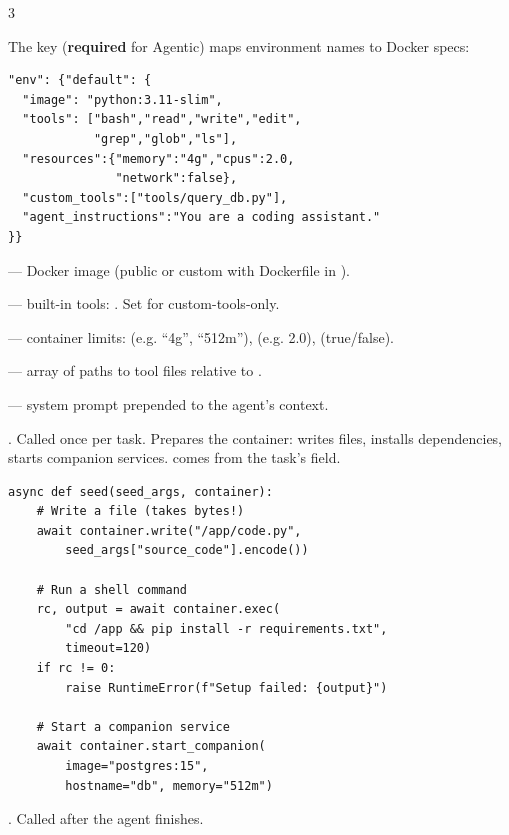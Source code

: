\documentclass[10pt,landscape]{article}
\begin{document}
\begin{multicols}{3}

The  key (\textbf{required} for Agentic) maps environment names to Docker specs:

\begin{lstlisting}
"env": {"default": {
  "image": "python:3.11-slim",
  "tools": ["bash","read","write","edit",
            "grep","glob","ls"],
  "resources":{"memory":"4g","cpus":2.0,
               "network":false},
  "custom_tools":["tools/query_db.py"],
  "agent_instructions":"You are a coding assistant."
}}
\end{lstlisting}

 --- Docker image (public or custom with Dockerfile in ).

 --- built-in tools: . Set \mono{[]} for custom-tools-only.

 --- container limits:  (e.g. ``4g'', ``512m''),  (e.g. 2.0),  (true/false).

 --- array of paths to tool files relative to .

 --- system prompt prepended to the agent's context.


 . Called once per task. Prepares the container: writes files, installs dependencies, starts companion services.  comes from the task's  field.

\begin{lstlisting}
async def seed(seed_args, container):
    # Write a file (takes bytes!)
    await container.write("/app/code.py",
        seed_args["source_code"].encode())

    # Run a shell command
    rc, output = await container.exec(
        "cd /app && pip install -r requirements.txt",
        timeout=120)
    if rc != 0:
        raise RuntimeError(f"Setup failed: {output}")

    # Start a companion service
    await container.start_companion(
        image="postgres:15",
        hostname="db", memory="512m")
\end{lstlisting}


 . Called after the agent finishes.


\end{multicols}
\end{document}
